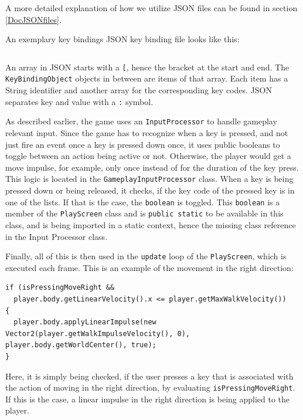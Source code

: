 \documentclass[12p]{article}
\begin{document}
A more detailed explanation of how we utilize JSON files can be found in section \ref{DocJSONfiles}.

An exemplary key bindings JSON key binding file looks like this:

\newpage

\inputminted[linenos,breaklines]{json}{code/json/keybindings.json}

An array in JSON starts with a \texttt{[}, hence the bracket at the start and end. The \texttt{KeyBindingObject} objects in between are items of that array. Each item has a String identifier and another array for the corresponding key codes. JSON separates key and value with a \texttt{:} symbol.

As described earlier, the game uses an \texttt{InputProcessor} to handle gameplay relevant input. Since the game has to recognize when a key is pressed, and not just fire an event once a key is pressed down once, it uses public booleans to toggle between an action being active or not. Otherwise, the player would get a move impulse, for example, only once instead of for the duration of the key press. This logic is located in the \texttt{GameplayInputProcessor} class. When a key is being pressed down or being released, it checks, if the key code of the pressed key is in one of the lists. If that is the case, the \texttt{boolean} is toggled. This \texttt{boolean} is a member of the \texttt{PlayScreen} class and is \texttt{public static} to be available in this class, and is being imported in a static context, hence the missing class reference in the Input Processor class.

Finally, all of this is then used in the \texttt{update} loop of the \texttt{PlayScreen}, which is executed each frame. This is an example of the movement in the right direction:

\begin{verbatim}
if (isPressingMoveRight &&
  player.body.getLinearVelocity().x <= player.getMaxWalkVelocity()) 
{
  player.body.applyLinearImpulse(new Vector2(player.getWalkImpulseVelocity(), 0), player.body.getWorldCenter(), true);
}
\end{verbatim}

Here, it is simply being checked, if the user presses a key that is associated with the action of moving in the right direction, by evaluating \texttt{isPressingMoveRight}. If this is the case, a linear impulse in the right direction is being applied to the player.
\end{document}
